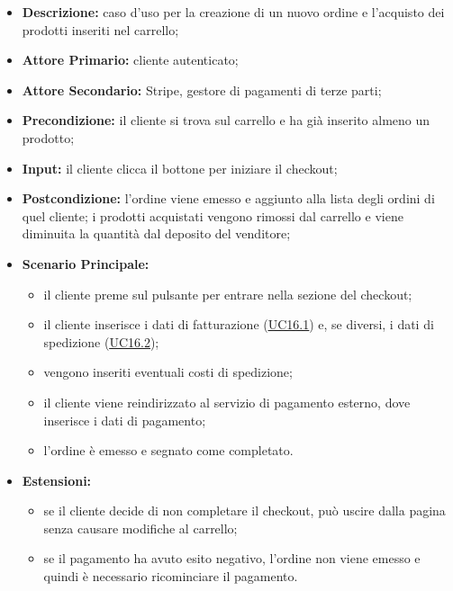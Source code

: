                 \begin{itemize}
                \item \textbf{Descrizione:} caso d'uso per la creazione di un nuovo ordine e l'acquisto dei prodotti inseriti nel carrello;
                \item \textbf{Attore Primario:} cliente autenticato;
                \item \textbf{Attore Secondario:} Stripe, gestore di pagamenti di terze parti;
                \item \textbf{Precondizione:} il cliente si trova sul carrello e ha già inserito almeno un prodotto;
                \item \textbf{Input:} il cliente clicca il bottone per iniziare il checkout;
                \item \textbf{Postcondizione:} l'ordine viene emesso e aggiunto alla lista degli ordini di quel cliente; i prodotti acquistati vengono rimossi dal carrello e viene diminuita la quantità dal deposito del venditore;
                \item \textbf{Scenario Principale:} 
                    \begin{itemize}
                        \item il cliente preme sul pulsante per entrare nella sezione del checkout;
                        \item il cliente inserisce i dati di fatturazione (\hyperref[sec:UC16.1]{\underline{UC16.1}}) e, se diversi, i dati di spedizione (\hyperref[sec:UC16.2]{\underline{UC16.2}});
                        \item vengono inseriti eventuali costi di spedizione;
                        \item il cliente viene reindirizzato al servizio di pagamento esterno, dove inserisce i dati di pagamento;
                        \item l'ordine è emesso e segnato come completato.
                    \end{itemize}
                \item \textbf{Estensioni:}
                    \begin{itemize}
                        \item se il cliente decide di non completare il checkout, può uscire dalla pagina senza causare modifiche al carrello;
                        \item se il pagamento ha avuto esito negativo, l'ordine non viene emesso e quindi è necessario ricominciare il pagamento.
                    \end{itemize}
            \end{itemize}

